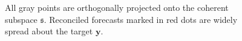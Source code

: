\documentclass[12pt]{article}
\theoremstyle{definition}
\theoremstyle{property}
\begin{document}
	\begin{figure}[H]
		\centering
		\small
		\caption{All gray points are orthogonally projected onto the coherent subspace $\mathfrak{s}$. Reconciled forecasts marked in red dots are widely spread about the target $\bm{y}$.}\label{fig:Orthogonal_projection_all_points}
	\end{figure}
	
\end{document}
